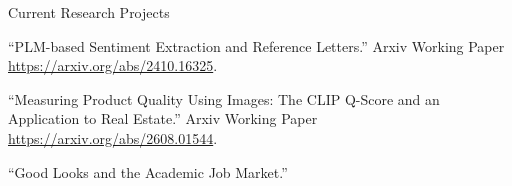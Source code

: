 
\def\arraystretch{1.3}

\begin{rubric}{Current Research Projects}

\entry*[] ``PLM-based Sentiment Extraction and Reference Letters.'' Arxiv Working Paper \url{https://arxiv.org/abs/2410.16325}.

\entry*[] ``Measuring Product Quality Using Images: The CLIP Q-Score and an Application to Real Estate.'' Arxiv Working Paper \url{https://arxiv.org/abs/2608.01544}.


\entry*[] ``Good Looks and the Academic Job Market.''


\end{rubric}
